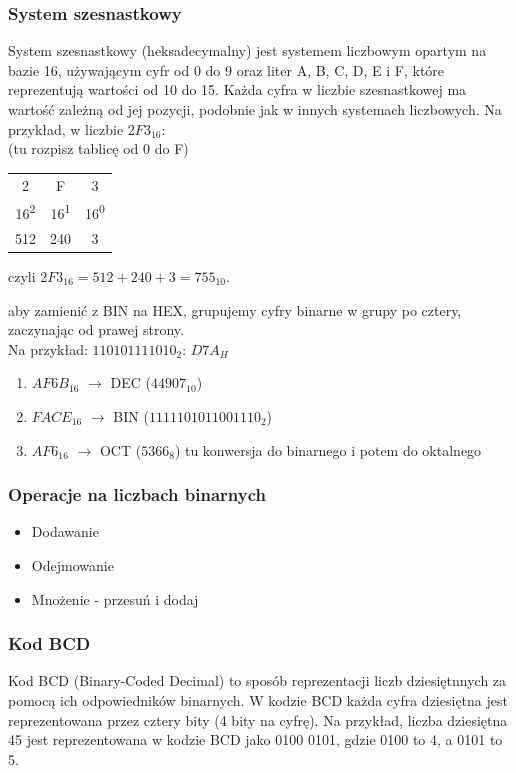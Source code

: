 \documentclass[a4paper,12pt]{article}
\begin{document}
\subsubsection*{System szesnastkowy}
System szesnastkowy (heksadecymalny) jest systemem liczbowym opartym na bazie 16, używającym cyfr od 0 do 9 oraz liter A, B, C, D, E i F, które reprezentują wartości od 10 do 15. Każda cyfra w liczbie szesnastkowej ma wartość zależną od jej pozycji, podobnie jak w innych systemach liczbowych. Na przykład, w liczbie $2F3_{16}$:
\\
(tu rozpisz tablicę od 0 do F)
\\
\begin{table}[H]
\centering
\begin{tabular}{|c|c|c|}
\hline
2 & F & 3 \\
16\textsuperscript{2} & 16\textsuperscript{1} & 16\textsuperscript{0} \\
512 & 240 & 3 \\
\hline
\end{tabular}
\end{table}

czyli $2F3_{16} = 512 + 240 + 3 = 755_{10}$.

aby zamienić z BIN na HEX, grupujemy cyfry binarne w grupy po cztery, zaczynając od prawej strony.
\\
Na przykład: $110101111010_2$: $D7A_{H}$

\begin{enumerate}
    \item $AF6B_{16}$ $\rightarrow$ DEC ($44907_{10}$)
    \item $FACE_{16}$ $\rightarrow$ BIN ($1111101011001110_2$)
    \item $AF6_{16}$ $\rightarrow$ OCT ($5366_8$) tu konwersja do binarnego i potem do oktalnego
\end{enumerate}

\subsubsection*{Operacje na liczbach binarnych}
\begin{itemize}
    \item Dodawanie
    \item Odejmowanie
    \item Mnożenie - przesuń i dodaj
\end{itemize}

\subsubsection*{Kod BCD}
Kod BCD (Binary-Coded Decimal) to sposób reprezentacji liczb dziesiętnnych za pomocą ich odpowiedników binarnych. W kodzie BCD każda cyfra dziesiętna jest reprezentowana przez cztery bity (4 bity na cyfrę). Na przykład, liczba dziesiętna 45 jest reprezentowana w kodzie BCD jako 0100 0101, gdzie 0100 to 4, a 0101 to 5.
\end{document}
